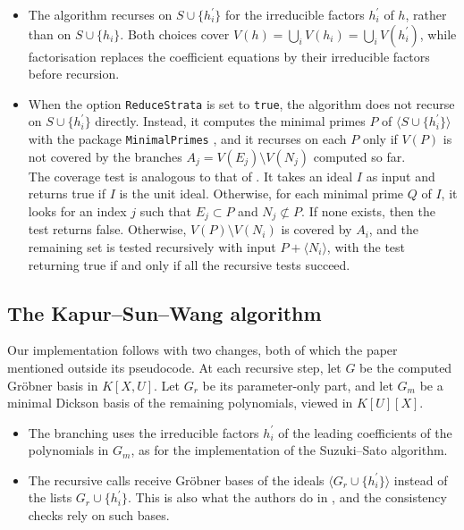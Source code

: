 \documentclass[11pt]{amsart}
\theoremstyle{plain}
\theoremstyle{definition}
\theoremstyle{remark}
\begin{document}
\begin{itemize}
    \item The algorithm recurses on $S\cup\lbrace h^\prime_i\rbrace$ for the irreducible factors $h^\prime_i$ of $h$, rather than on $S\cup\lbrace h_i\rbrace$. Both choices cover $V(h)=\bigcup_i V(h_i)=\bigcup_i V(h^\prime_i)$, while factorisation replaces the coefficient equations by their irreducible factors before recursion.
    \item When the option \texttt{ReduceStrata} is set to \texttt{true}, the algorithm does not recurse on $S\cup\lbrace h^\prime_i\rbrace$ directly.
    Instead, it computes the minimal primes $P$ of $\langle S\cup\lbrace h^\prime_i\rbrace\rangle$ with the package \texttt{MinimalPrimes} \cite{MinimalPrimesSource},
    and it recurses on each $P$ only if $V(P)$ is not covered by the branches $A_j=V(E_j)\setminus V(N_j)$ computed so far. \\
    The coverage test is analogous to that of \cite[Table 6]{montes2010grobner}. It takes an ideal $I$ as input and returns true if $I$ is the unit ideal. Otherwise, for each minimal prime $Q$ of $I$, it looks for an index $j$ such that $E_j\subset P$ and $N_j\not\subset P$. If none exists, then the test returns false. Otherwise, $V(P)\setminus V(N_i)$ is covered by $A_i$, and the remaining set is tested recursively with input $P+\langle N_i\rangle$, with the test returning true if and only if all the recursive tests succeed.
\end{itemize}

\subsection{The Kapur--Sun--Wang algorithm}

Our implementation follows \cite[Section 4.1]{KAPUR201327} with two changes, both of which the paper mentioned outside its pseudocode.
At each recursive step, let $G$ be the computed Gröbner basis in $K[X,U]$. Let $G_r$ be its parameter-only part, and let $G_m$ be a minimal Dickson basis of the remaining polynomials, viewed in $K[U][X]$.
\begin{itemize}
    \item The branching uses the irreducible factors $h^\prime_i$ of the leading coefficients of the polynomials in $G_m$, as for the implementation of the Suzuki--Sato algorithm.
    \item The recursive calls receive Gröbner bases of the ideals $\langle G_r\cup\lbrace h^\prime_i\rbrace\rangle$ instead of the lists $G_r\cup\lbrace h^\prime_i\rbrace$. This is also what the authors do in \cite[Example 6.1]{KAPUR201327}, and the consistency checks rely on such bases.
\end{itemize}
\end{document}
